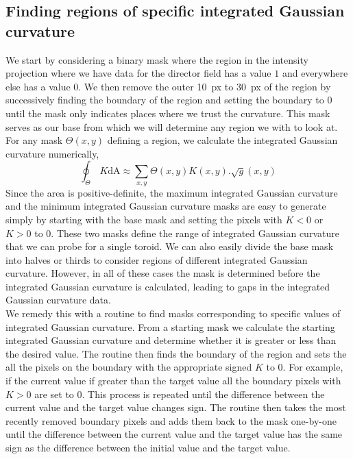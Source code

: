 \subsection{Finding regions of specific integrated Gaussian curvature}
We start by considering a binary mask where the region in the intensity projection where we have data for the director field has a value $1$ and everywhere else has a value $0$.
We then remove the outer 10~px to 30~px of the region by successively finding the boundary of the region and setting the boundary to $0$ until the mask only indicates places where we trust the curvature.
This mask serves as our base from which we will determine any region we with to look at.
For any mask $\Theta(x,y)$ defining a region, we calculate the integrated Gaussian curvature numerically,
\begin{equation}
  \oint_{\Theta}\,K\textrm{dA} \approx \sum\limits_{x,y} \Theta(x,y) K(x,y). \sqrt{g}(x,y)
\end{equation}
Since the area is positive-definite, the maximum integrated Gaussian curvature and the minimum integrated Gaussian curvature masks are easy to generate simply by starting with the base mask and setting the pixels with $K < 0$ or $K > 0$ to $0$.
These two masks define the range of integrated Gaussian curvature that we can probe for a single toroid.
We can also easily divide the base mask into halves or thirds to consider regions of different integrated Gaussian curvature.
However, in all of these cases the mask is determined before the integrated Gaussian curvature is calculated, leading to gaps in the integrated Gaussian curvature data. \\

We remedy this with a routine to find masks corresponding to specific values of integrated Gaussian curvature.
From a starting mask we calculate the starting integrated Gaussian curvature and determine whether it is greater or less than the desired value.
The routine then finds the boundary of the region and sets the all the pixels on the boundary with the appropriate signed $K$ to $0$.
For example, if the current value if greater than the target value all the boundary pixels with $K > 0$ are set to $0$.
This process is repeated until the difference between the current value and the target value changes sign.
The routine then takes the most recently removed boundary pixels and adds them back to the mask one-by-one until the difference between the current value and the target value has the same sign as the difference between the initial value and the target value.


